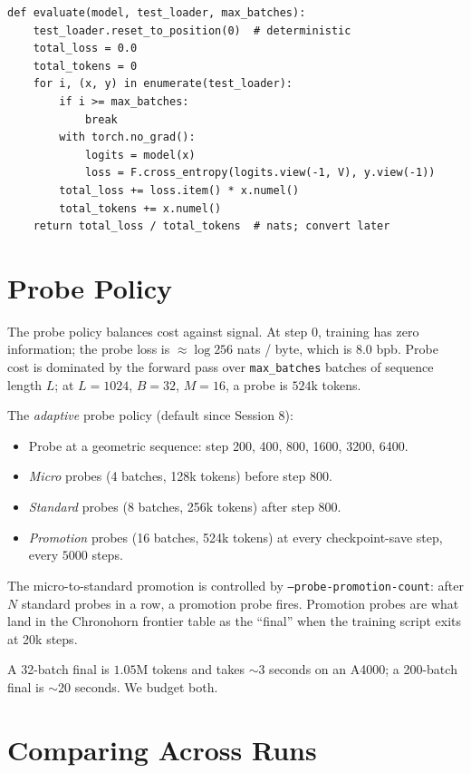 \documentclass[11pt,openany]{book}
\theoremstyle{definition}
\theoremstyle{plain}
\begin{document}
\begin{lstlisting}[language=pyshell,caption={Eval stream reset (simplified)}]
def evaluate(model, test_loader, max_batches):
    test_loader.reset_to_position(0)  # deterministic
    total_loss = 0.0
    total_tokens = 0
    for i, (x, y) in enumerate(test_loader):
        if i >= max_batches:
            break
        with torch.no_grad():
            logits = model(x)
            loss = F.cross_entropy(logits.view(-1, V), y.view(-1))
        total_loss += loss.item() * x.numel()
        total_tokens += x.numel()
    return total_loss / total_tokens  # nats; convert later
\end{lstlisting}

\section{Probe Policy}

The probe policy balances cost against signal. At step 0, training has zero
information; the probe loss is $\approx \log 256$ nats / byte, which is 8.0
bpb. Probe cost is dominated by the forward pass over \texttt{max\_batches}
batches of sequence length $L$; at $L=1024$, $B=32$, $M=16$, a probe is
$524$k tokens.

The \emph{adaptive} probe policy (default since Session 8):
\begin{itemize}
  \item Probe at a geometric sequence: step 200, 400, 800, 1600, 3200, 6400.
  \item \emph{Micro} probes (4 batches, 128k tokens) before step 800.
  \item \emph{Standard} probes (8 batches, 256k tokens) after step 800.
  \item \emph{Promotion} probes (16 batches, 524k tokens) at every
    checkpoint-save step, every $5000$ steps.
\end{itemize}

The micro-to-standard promotion is controlled by \texttt{--probe-promotion-count}:
after $N$ standard probes in a row, a promotion probe fires. Promotion probes
are what land in the Chronohorn frontier table as the ``final'' when the
training script exits at 20k steps.

A 32-batch final is $1.05$M tokens and takes $\sim$3 seconds on an A4000;
a 200-batch final is $\sim$20 seconds. We budget both.

\section{Comparing Across Runs}
\end{document}
